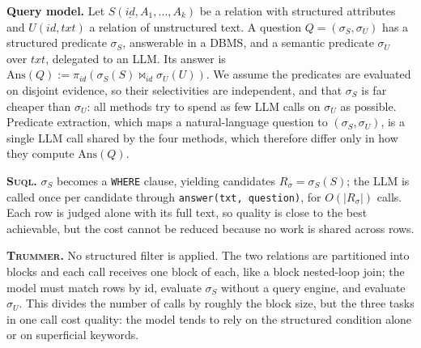 \documentclass[sigconf]{acmart}
\begin{document}
\textbf{Query model.} Let $S(\underline{\mathit{id}}, A_1,\dots,A_k)$ be a relation with structured attributes and $U(\mathit{id}, \mathit{txt})$ a relation of unstructured text. A question $Q = (\sigma_S,\sigma_U)$ has a structured predicate $\sigma_S$, answerable in a DBMS, and a semantic predicate $\sigma_U$ over $\mathit{txt}$, delegated to an LLM. Its answer is $\mathrm{Ans}(Q) := \pi_{\mathit{id}}\left(\sigma_S(S) \bowtie_{\mathit{id}} \sigma_U(U)\right)$. We assume the predicates are evaluated on disjoint evidence, so their selectivities are independent, and that $\sigma_S$ is far cheaper than $\sigma_U$: all methods try to spend as few LLM calls on $\sigma_U$ as possible. Predicate extraction, which maps a natural-language question to $(\sigma_S,\sigma_U)$, is a single LLM call shared by the four methods, which therefore differ only in how they compute $\mathrm{Ans}(Q)$.

\textbf{\textsc{Suql}.} $\sigma_S$ becomes a \texttt{WHERE} clause, yielding candidates $R_\sigma = \sigma_S(S)$; the LLM is called once per candidate through \texttt{answer(txt, question)}, for $O(|R_\sigma|)$ calls. Each row is judged alone with its full text, so quality is close to the best achievable, but the cost cannot be reduced because no work is shared across rows.

\textbf{\textsc{Trummer}.} No structured filter is applied. The two relations are partitioned into blocks and each call receives one block of each, like a block nested-loop join; the model must match rows by id, evaluate $\sigma_S$ without a query engine, and evaluate $\sigma_U$. This divides the number of calls by roughly the block size, but the three tasks in one call cost quality: the model tends to rely on the structured condition alone or on superficial keywords.
\end{document}
